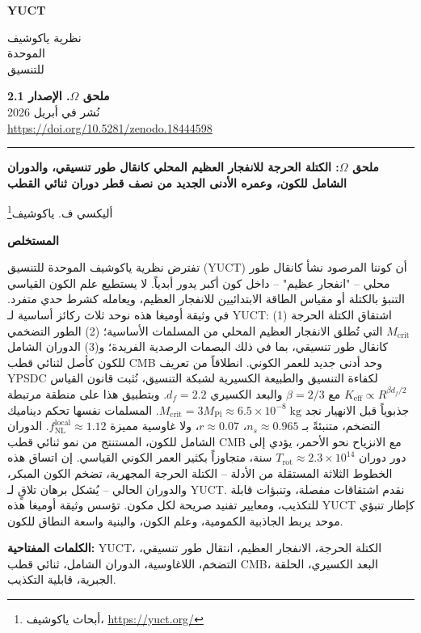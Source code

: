 \documentclass[12pt,a4paper]{article}
\newcommand{\makeheader}{%
	\noindent
	\begin{minipage}{0.17\textwidth}
		\raggedright
		{\sffamily\bfseries\color{skyblue}\fontsize{46}{46}\selectfont YUCT}%
	\end{minipage}%
	\hspace{30pt}
	\begin{minipage}{0.32\textwidth}
		\raggedright
		{\sffamily\fontsize{11}{13}\selectfont نظرية ياكوشيف\\ الموحدة\\ للتنسيق}%
	\end{minipage}%
	\hfill
	\begin{minipage}{0.38\textwidth}
		\raggedleft
		{\sffamily\bfseries ملحق \(\Omega\). الإصدار 2.1}\\
		{\sffamily نُشر في أبريل 2026}\\
		{\sffamily\footnotesize \url{https://doi.org/10.5281/zenodo.18444598}}%
	\end{minipage}
	\par\vspace{5pt}
	\noindent\textcolor{gold}{\rule{\textwidth}{1.6pt}}
	\par\vspace{0pt}
}
\begin{document}
	\thispagestyle{firstpage}
	\makeheader
	
	\vspace{0cm}
	{\LARGE\bfseries ملحق \(\Omega\): الكتلة الحرجة للانفجار العظيم المحلي كانقال طور تنسيقي، والدوران الشامل للكون، وعمره الأدنى الجديد من نصف قطر دوران ثنائي القطب \par}
	\vspace{0.2cm}
	
	{\large أليكسي ف. ياكوشيف\footnote{أبحاث ياكوشيف، \url{https://yuct.org/}}} \\
	\vspace{0.0cm}
	
	{\color{darkblue}\textbf{\LARGE المستخلص}} \par
	{\large
		\noindent
		تفترض نظرية ياكوشيف الموحدة للتنسيق (YUCT) أن كوننا المرصود نشأ كانقال طور محلي – "انفجار عظيم" – داخل كون أكبر يدور أبدياً. لا يستطيع علم الكون القياسي التنبؤ بالكتلة أو مقياس الطاقة الابتدائيين للانفجار العظيم، ويعامله كشرط حدي متفرد. في وثيقة أوميغا هذه نوحد ثلاث ركائز أساسية لـ YUCT: (1) اشتقاق الكتلة الحرجة \(M_{\mathrm{crit}}\) التي تُطلق الانفجار العظيم المحلي من المسلمات الأساسية؛ (2) الطور التضخمي كانقال طور تنسيقي، بما في ذلك البصمات الرصدية الفريدة؛ و(3) الدوران الشامل للكون كأصل لثنائي قطب CMB وحد أدنى جديد للعمر الكوني. انطلاقاً من تعريف YPSDC لكفاءة التنسيق والطبيعة الكسيرية لشبكة التنسيق، نُثبت قانون القياس \(K_{\mathrm{eff}} \propto R^{\beta d_f/2}\) مع \(\beta = 2/3\) والبعد الكسيري \(d_f = 2.2\). وبتطبيق هذا على منطقة مرتبطة جذبوياً قبل الانهيار نجد \(M_{\mathrm{crit}} = 3 M_{\mathrm{Pl}} \approx 6.5 \times 10^{-8}\;\text{kg}\). المسلمات نفسها تحكم ديناميك التضخم، متنبئةً بـ \(n_s \approx 0.965\)، \(r \approx 0.07\)، ولا غاوسية مميزة \(f_{\mathrm{NL}}^{\mathrm{local}} \approx 1.12\). الدوران الشامل للكون، المستنتج من نمو ثنائي قطب CMB مع الانزياح نحو الأحمر، يؤدي إلى دور دوران \(T_{\mathrm{rot}} \approx 2.3 \times 10^{14}\) سنة، متجاوزاً بكثير العمر الكوني القياسي. إن اتساق هذه الخطوط الثلاثة المستقلة من الأدلة – الكتلة الحرجة المجهرية، تضخم الكون المبكر، والدوران الحالي – يُشكل برهان تلاقٍ لـ YUCT. نقدم اشتقاقات مفصلة، وتنبؤات قابلة للتكذيب، ومعايير تفنيد صريحة لكل مكون. تؤسس وثيقة أوميغا هذه YUCT كإطار تنبؤي موحد يربط الجاذبية الكمومية، وعلم الكون، والبنية واسعة النطاق للكون.
	}
	
	\vspace{0.1cm}
	\noindent
	{\color{darkblue}\textbf{الكلمات المفتاحية:}} YUCT، الكتلة الحرجة، الانفجار العظيم، انتقال طور تنسيقي، التضخم، اللاغاوسية، الدوران الشامل، ثنائي قطب CMB، البعد الكسيري، الحلقة الجبرية، قابلية التكذيب.
	
\end{document}
